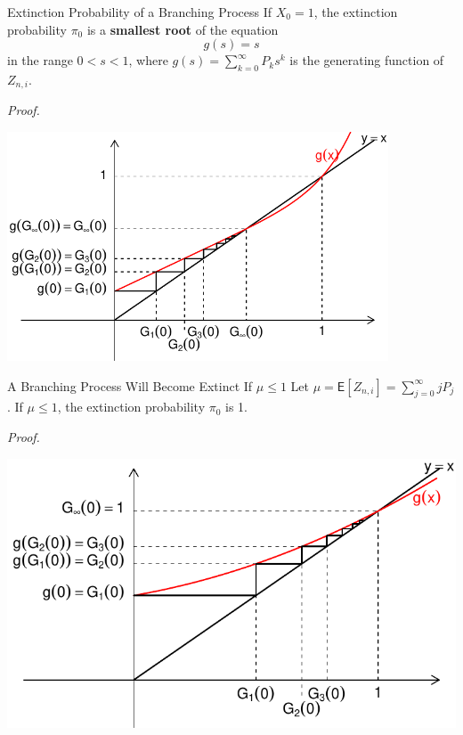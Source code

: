 \documentclass[letterpaper, mathserif]{beamer}
\def\E{\mathsf E}
\def\Sum{\sum\nolimits}
\begin{document}
\begin{frame}{Extinction Probability of a Branching Process}
If $X_0=1$, the extinction probability $\pi_0$ is a {\bf smallest root}
of the equation
\begin{equation}\label{eq:extinct}
g(s)=s
\end{equation}
in the range $0<s<1$,
where $g(s)=\sum_{k=0}^{\infty}P_ks^k$ is the generating function of $Z_{n,i}$.

{\em Proof.} 
\begin{center}
\includegraphics[width=0.85\textwidth]{extinction.pdf}
\end{center}
\end{frame}
\begin{frame}{A Branching Process Will Become Extinct If $\mu\le 1$}
Let $\mu=\E[Z_{n,i}]=\Sum_{j=0}^{\infty}jP_j$. If $\mu\le 1$, the extinction probability $\pi_0$ is 1.

{\em Proof.}
\begin{center}
\includegraphics[width=\textwidth]{extinction2.pdf}
\end{center}
\end{frame}
\end{document}
